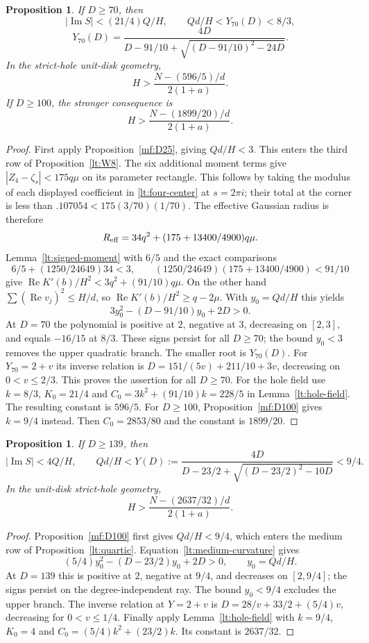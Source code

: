 \documentclass[11pt,reqno]{amsart}
\numberwithin{equation}{section}
\newtheorem{proposition}[theorem]{Proposition}
\theoremstyle{definition}
\theoremstyle{remark}
\renewcommand{\Re}{\operatorname{Re}}
\renewcommand{\Im}{\operatorname{Im}}
\begin{document}
\begin{proposition}\label{lt:D70}
If $D\ge70$, then
\[
 |\Im S|<(21/4)Q/H,\qquad Qd/H<Y_{70}(D)<8/3,
\]
\[
 Y_{70}(D)=\frac{4D}{D-91/10+\sqrt{(D-91/10)^2-24D}}.
\]
In the strict-hole unit-disk geometry,
\begin{equation}\label{lt:field70}
 H>\frac{N-(596/5)/d}{2(1+a)}.
\end{equation}
If $D\ge100$, the stronger consequence is
\begin{equation}\label{lt:field100}
 H>\frac{N-(1899/20)/d}{2(1+a)}.
\end{equation}
\end{proposition}
\begin{proof}
First apply Proposition~\ref{mf:D25}, giving $Qd/H<3$.
This enters the third row of Proposition~\ref{lt:W8}.
The six additional moment terms give
$|Z_4-\zeta_s|<175q\mu$ on its parameter rectangle.
This follows by taking the modulus of each displayed coefficient in
\eqref{lt:four-center} at $s=2\pi i$; their total at the corner
is less than $.107054<175(3/70)(1/70)$.
The effective Gaussian radius is therefore
\[
 R_{\rm eff}=34q^2+(175+13400/4900)q\mu.
\]
Lemma~\ref{lt:signed-moment} with $6/5$ and the exact comparisons
\[
 6/5+(1250/24649)34<3,\qquad
 (1250/24649)(175+13400/4900)<91/10
\]
give $\Re K'(b)/H^2<3q^2+(91/10)q\mu$.
On the other hand $\sum(\Re v_j)^2\le H/d$, so
$\Re K'(b)/H^2\ge q-2\mu$.
With $y_0=Qd/H$ this yields
\[
 3y_0^2-(D-91/10)y_0+2D>0.
\]
At $D=70$ the polynomial is positive at $2$, negative at $3$,
decreasing on $[2,3]$, and equals $-16/15$ at $8/3$.
These signs persist for all $D\ge70$; the bound $y_0<3$ removes
the upper quadratic branch. The smaller root is $Y_{70}(D)$.
For $Y_{70}=2+v$ its inverse relation is
$D=151/(5v)+211/10+3v$, decreasing on $0<v\le2/3$.
This proves the assertion for all $D\ge70$.
For the hole field use $k=8/3$, $K_0=21/4$ and
$C_0=3k^2+(91/10)k=228/5$ in Lemma~\ref{lt:hole-field}.
The resulting constant is $596/5$. For $D\ge100$,
Proposition~\ref{mf:D100} gives $k=9/4$ instead.
Then $C_0=2853/80$ and the constant is $1899/20$.
\end{proof}

\begin{proposition}\label{lt:medium139}
If $D\ge139$, then
\[
 |\Im S|<4Q/H,\qquad
 Qd/H<Y(D):=\frac{4D}{D-23/2+\sqrt{(D-23/2)^2-10D}}<9/4.
\]
In the unit-disk strict-hole geometry,
\begin{equation}\label{lt:medium-field}
 H>\frac{N-(2637/32)/d}{2(1+a)}.
\end{equation}
\end{proposition}
\begin{proof}
Proposition~\ref{mf:D100} first gives $Qd/H<9/4$, which
enters the medium row of Proposition~\ref{lt:quartic}.
Equation~\eqref{lt:medium-curvature} gives
\[
 (5/4)y_0^2-(D-23/2)y_0+2D>0,\qquad y_0=Qd/H.
\]
At $D=139$ this is positive at $2$, negative at $9/4$, and
decreases on $[2,9/4]$; the signs persist on the degree-independent
ray. The bound $y_0<9/4$ excludes the upper branch. The inverse relation
at $Y=2+v$ is $D=28/v+33/2+(5/4)v$, decreasing for
$0<v\le1/4$. Finally apply Lemma~\ref{lt:hole-field} with
$k=9/4$, $K_0=4$ and $C_0=(5/4)k^2+(23/2)k$.
Its constant is $2637/32$.
\end{proof}
\end{document}
